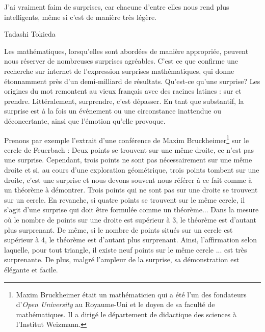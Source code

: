 \epigraph{J'ai vraiment faim de surprises, car chacune d'entre elles nous rend plus intelligents, même si c'est de manière très légère.}{Tadashi Tokieda}



\medskip

Les mathématiques, lorsqu'elles sont abordées de manière appropriée, peuvent nous réserver de nombreuses surprises agréables. C'est ce que confirme une recherche sur internet de l'expression \og surprises mathématiques\fg, qui donne étonnamment près d'un demi-milliard de résultats. Qu'est-ce qu'une surprise? Les origines du mot remontent au vieux français avec des racines latines : \og sur\fg{}  et \og prendre\fg. Littéralement, surprendre, c'est dépasser. En tant que substantif, la surprise est à la fois un événement ou une circonstance inattendue ou déconcertante, ainsi que l'émotion qu'elle provoque.


Prenons par exemple l'extrait d'une conférence de Maxim Bruckheimer\footnote{Maxim Bruckheimer était un mathématicien qui a été l'un des fondateurs d'\emph{Open University} au Royaume-Uni et le doyen de sa faculté de mathématiques. Il a dirigé le département de didactique des sciences à l'Institut Weizmann.} sur le cercle de Feuerbach : \og Deux points se trouvent sur une même  droite, ce n'est pas une surprise. Cependant, trois points ne sont pas nécessairement sur une même droite et si, au cours d'une exploration géométrique, trois points \og tombent\fg{} sur une  droite, c'est une surprise et nous devons souvent nous référer à ce fait comme à un théorème à démontrer. Trois points qui ne sont pas sur une  droite se trouvent sur un cercle. En revanche, si quatre points se trouvent sur le même cercle, il s'agit d'une surprise qui doit être formulée comme un théorème... Dans la mesure où le nombre de points sur une droite est supérieur à 3, le théorème est d'autant plus surprenant. De même, si le nombre de points situés sur un cercle est supérieur à 4, le théorème est d'autant plus surprenant. Ainsi, l'affirmation selon laquelle, pour tout triangle, il existe neuf points  sur le même cercle ... est très surprenante. De plus, malgré l'ampleur de la surprise, sa démonstration est élégante et facile.\fg{}

